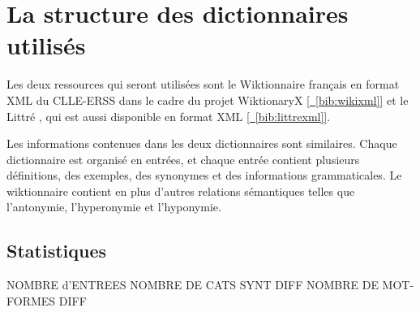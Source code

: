 \section{La structure des dictionnaires utilisés}

Les deux ressources qui seront utilisées sont le Wiktionnaire français en 
format XML du CLLE-ERSS dans le cadre du projet WiktionaryX 
\hyperref[bib:wikixml]{[~\ref*{bib:wikixml}]} et le Littré , qui est aussi 
disponible en format XML \hyperref[bib:littrexml]{[~\ref*{bib:littrexml}]}.

Les informations contenues dans les deux dictionnaires sont similaires. Chaque 
dictionnaire est organisé en entrées, et chaque entrée contient plusieurs 
définitions, des exemples, des synonymes et des informations grammaticales. Le 
wiktionnaire contient en plus d'autres relations sémantiques telles que 
l'antonymie, l'hyperonymie et l’hyponymie.

\subsection{Statistiques}

NOMBRE d'ENTREES
NOMBRE DE CATS SYNT DIFF
NOMBRE DE MOT-FORMES DIFF
